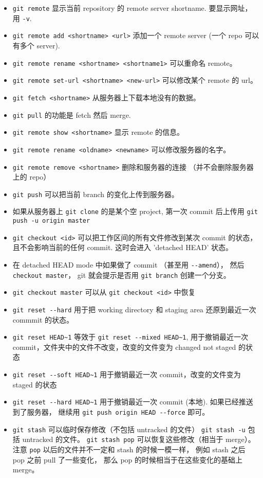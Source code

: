 \begin{itemize}
\item \verb|git remote| 显示当前 repository 的 remote server shortname. 要显示网址， 用 \verb|-v|.
\item \verb|git remote add <shortname> <url>| 添加一个 remote server (一个 repo 可以有多个 server).
\item \verb|git remote rename <shortname> <shortname1>| 可以重命名 remote。
\item \verb|git remote set-url <shortname> <new-url>| 可以修改某个 remote 的 url。
\item \verb|git fetch <shortname>| 从服务器上下载本地没有的数据。
\item \verb|git pull| 的功能是 fetch 然后 merge.
\item \verb|git remote show <shortname>| 显示 remote 的信息。
\item \verb|git remote rename <oldname> <newname>| 可以修改服务器的名字。
\item \verb|git remote remove <shortname>| 删除和服务器的连接 （并不会删除服务器上的 repo）
\item \verb|git push| 可以把当前 branch 的变化上传到服务器。
\item 如果从服务器上 \verb|git clone| 的是某个空 project, 第一次 commit 后上传用 \verb|git push -u origin master|
\item \verb|git checkout <id>| 可以把工作区间的所有文件修改到某次 commit 的状态， 且不会影响当前的任何 commit. 这时会进入 'detached HEAD' 状态。
\item 在 detached HEAD mode 中如果做了 commit （甚至用 \verb|--amend|）， 然后 \verb|checkout master|， git 就会提示是否用 \verb|git branch| 创建一个分支。
\item \verb|git checkout master| 可以从 \verb|git checkout <id>| 中恢复
\item \verb|git reset --hard| 用于把 working directory 和 staging area 还原到最近一次 commmit 的状态。
\item \verb|git reset HEAD~1| 等效于 \verb|git reset --mixed HEAD~1|, 用于撤销最近一次 commit，文件夹中的文件不改变，改变的文件变为 changed not staged 的状态
\item \verb|git reset --soft HEAD~1| 用于撤销最近一次 commit，改变的文件变为 staged 的状态
\item \verb|git reset --hard HEAD~1| 用于撤销最近一次 commit (本地). 如果已经推送到了服务器， 继续用 \verb|git push origin HEAD --force| 即可。
\item \verb|git stash| 可以临时保存修改（不包括 untracked 的文件） \verb|git stash -u| 包括 untracked 的文件。 \verb|git stash pop| 可以恢复这些修改（相当于 merge）。 注意 \verb|pop| 以后的文件并不一定和 stash 的时候一模一样， 例如 stash 之后 pop 之前 pull 了一些变化， 那么 pop 的时候相当于在这些变化的基础上 merge。

\end{itemize}
